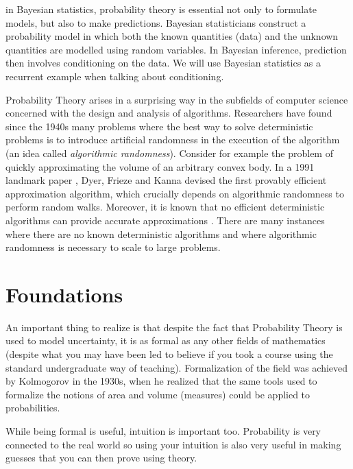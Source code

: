 \documentclass{article}
\begin{document}
 in Bayesian statistics, probability theory is essential not only to formulate models, but also to make predictions. Bayesian statisticians construct a probability model in which both the known quantities (data) and the unknown quantities are modelled using random variables. In Bayesian inference, prediction then involves  conditioning on the data.  We will use Bayesian statistics as a recurrent example when talking about conditioning. 

  Probability Theory arises in a surprising way in the subfields of computer science concerned with the design and analysis of algorithms. Researchers have found since the 1940s many problems where the best way to solve deterministic problems is to introduce artificial randomness in the execution of the algorithm (an idea called \emph{algorithmic randomness}). Consider for example the problem of quickly approximating the volume of an arbitrary convex body. In a 1991 landmark paper \cite{dyer_random_1991}, Dyer, Frieze and Kanna devised the first provably efficient approximation algorithm, which crucially depends on algorithmic randomness to perform random walks. Moreover, it is known that no efficient deterministic algorithms can provide accurate approximations \cite{bfirfiny_computing_nodate}. There are many instances where there are no known deterministic algorithms and where algorithmic randomness is necessary to scale to large problems.  


\section{Foundations}

  An important thing to realize is that despite the fact that Probability Theory is used to model uncertainty, it is as formal as any other fields of mathematics (despite what you may have been led to believe if you took a course using the standard undergraduate way of teaching). Formalization of the field was achieved by Kolmogorov in the 1930s, when he realized that the same tools used to formalize the notions of area and volume (measures) could be applied to probabilities. 

 While being formal is useful, intuition is important too. Probability is very connected to the real world so using your intuition is also very useful in making guesses that you can then prove using theory.
\end{document}
